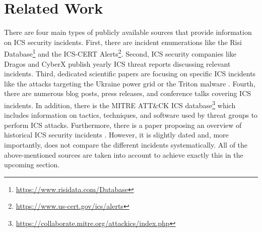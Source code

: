 \documentclass[runningheads]{llncs}
\begin{document}
\section{Related Work}
\label{section:related-work}
There are four main types of publicly available sources that provide information on ICS security incidents.
First, there are incident enumerations like the Risi Database\footnote{\url{https://www.risidata.com/Database}} and the ICS-CERT Alerts\footnote{\url{https://www.us-cert.gov/ics/alerts}}.
Second, ICS security companies like Dragos \cite{dragos.19} and CyberX \cite{cyberx.19} publish yearly ICS threat reports discussing relevant incidents.
Third, dedicated scientific papers are focusing on specific ICS incidents like the attacks targeting the Ukraine power grid \cite{eisac.16} or the Triton malware \cite{pinto.18}.
Fourth, there are numerous blog posts, press releases, and conference talks covering ICS incidents.
In addition, there is the MITRE ATT\&CK ICS database\footnote{\url{https://collaborate.mitre.org/attackics/index.php}} which includes information on tactics, techniques, and software used by threat groups to perform ICS attacks.
Furthermore, there is a paper proposing an overview of historical ICS security incidents \cite{hemsley.18}.
However, it is slightly dated and, more importantly, does not compare the different incidents systematically.
All of the above-mentioned sources are taken into account to achieve exactly this in the upcoming section.
\end{document}
